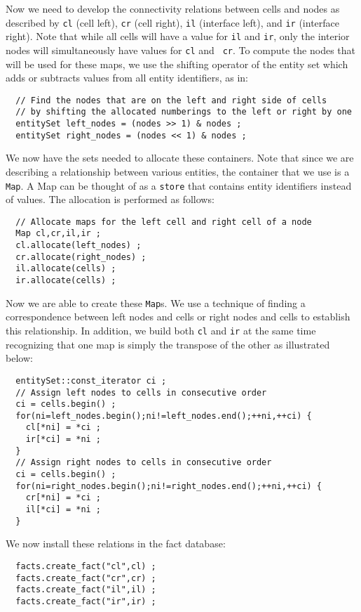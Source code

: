 \documentclass[10pt,epsf]{book}
\begin{document}
Now we need to develop the connectivity relations between cells and
nodes as described by {\tt cl} (cell left), {\tt cr} (cell right),
{\tt il} (interface left), and {\tt ir} (interface right).  Note that
while all cells will have a value for {\tt il} and {\tt ir}, only the
interior nodes will simultaneously have values for {\tt cl} and {\tt
  cr}.  To compute the nodes that will be used for these maps, we use
the shifting operator of the entity set which adds or subtracts values
from all entity identifiers, as in:
\begin{verbatim}
  // Find the nodes that are on the left and right side of cells
  // by shifting the allocated numberings to the left or right by one
  entitySet left_nodes = (nodes >> 1) & nodes ;
  entitySet right_nodes = (nodes << 1) & nodes ;
\end{verbatim}
We now have the sets needed to allocate these containers.  Note that
since we are describing a relationship between various entities, the
container that we use is a {\tt Map}.  A Map can be thought of as a
{\tt store} that contains entity identifiers instead of values.  The
allocation is performed as follows:
\begin{verbatim}
  // Allocate maps for the left cell and right cell of a node
  Map cl,cr,il,ir ;
  cl.allocate(left_nodes) ;
  cr.allocate(right_nodes) ;
  il.allocate(cells) ;
  ir.allocate(cells) ;
\end{verbatim}
Now we are able to create these {\tt Map}s.  We use a technique of
finding a correspondence between left nodes and cells or right nodes
and cells to establish this relationship.  In addition, we build both
{\tt cl} and {\tt ir} at the same time recognizing that one map is
simply the transpose of the other as illustrated below:
\begin{verbatim}
  entitySet::const_iterator ci ;
  // Assign left nodes to cells in consecutive order
  ci = cells.begin() ;
  for(ni=left_nodes.begin();ni!=left_nodes.end();++ni,++ci) {
    cl[*ni] = *ci ;
    ir[*ci] = *ni ;
  }
  // Assign right nodes to cells in consecutive order
  ci = cells.begin() ;
  for(ni=right_nodes.begin();ni!=right_nodes.end();++ni,++ci) {
    cr[*ni] = *ci ;
    il[*ci] = *ni ;
  }
\end{verbatim}
We now install these relations in the fact database:
\begin{verbatim}
  facts.create_fact("cl",cl) ;
  facts.create_fact("cr",cr) ;
  facts.create_fact("il",il) ;
  facts.create_fact("ir",ir) ;
\end{verbatim}
\end{document}

